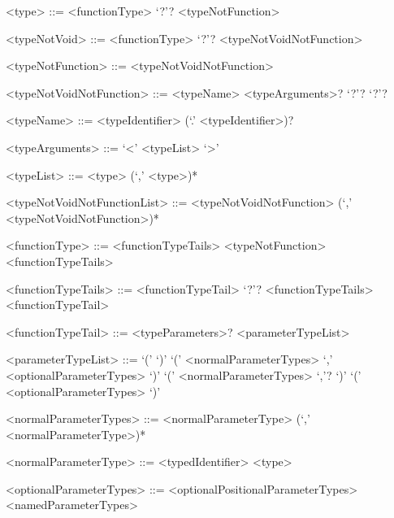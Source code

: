 \documentclass[makeidx]{article}
\begin{document}
{%


\begin{grammar}

<type> ::= <functionType> `?'?
  \alt <typeNotFunction>

<typeNotVoid> ::= <functionType> `?'?
  \alt <typeNotVoidNotFunction>

<typeNotFunction> ::= \VOID{}
  \alt <typeNotVoidNotFunction>

<typeNotVoidNotFunction> ::= <typeName> <typeArguments>? `?'?
  \alt \FUNCTION{} `?'?

<typeName> ::= <typeIdentifier> (`.' <typeIdentifier>)?

<typeArguments> ::= `<' <typeList> `>'

<typeList> ::= <type> (`,' <type>)*

<typeNotVoidNotFunctionList> ::= \gnewline{}
  <typeNotVoidNotFunction> (`,' <typeNotVoidNotFunction>)*

<functionType> ::= <functionTypeTails>
  \alt <typeNotFunction> <functionTypeTails>

<functionTypeTails> ::= <functionTypeTail> `?'? <functionTypeTails>
  \alt <functionTypeTail>

<functionTypeTail> ::= \FUNCTION{} <typeParameters>? <parameterTypeList>

<parameterTypeList> ::= `(' `)'
  \alt `(' <normalParameterTypes> `,' <optionalParameterTypes> `)'
  \alt `(' <normalParameterTypes> `,'? `)'
  \alt `(' <optionalParameterTypes> `)'

<normalParameterTypes> ::= \gnewline{}
  <normalParameterType> (`,' <normalParameterType>)*

<normalParameterType> ::= <typedIdentifier>
  \alt <type>

<optionalParameterTypes> ::= <optionalPositionalParameterTypes>
  \alt <namedParameterTypes>


\end{grammar}}
\end{document}
